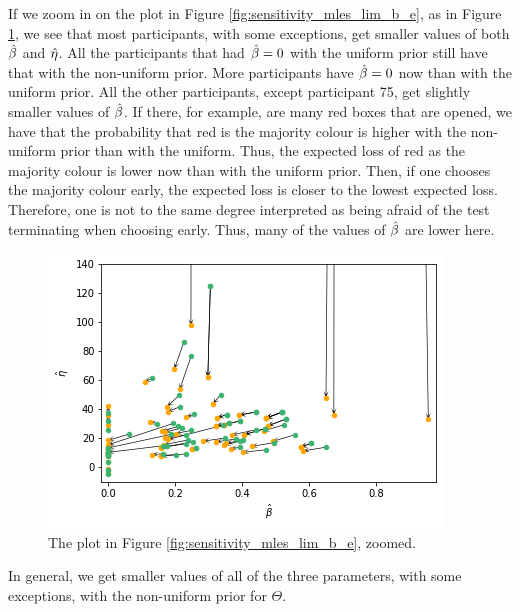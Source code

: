 If we zoom in on the plot in Figure \ref{fig:sensitivity_mles_lim_b_e}, as in Figure \ref{fig:sensitivity_mles_lim_b_e_zoomed}, we see that most participants, with some exceptions, get smaller values of both $\hat{\beta}$ and $\hat{\eta}$. All the participants that had $\hat{\beta}=0$ with the uniform prior still have that with the non-uniform prior. More participants have $\hat{\beta}=0$ now than with the uniform prior. All the other participants, except participant 75, get slightly smaller values of $\hat{\beta}$.
If there, for example, are many red boxes that are opened, we have that the probability that red is the majority colour is higher with the non-uniform prior than with the uniform. Thus, the expected loss of red as the majority colour is lower now than with the uniform prior. Then, if one chooses the majority colour early, the expected loss is closer to the lowest expected loss. Therefore, one is not to the same degree interpreted as being afraid of the test terminating when choosing early. Thus, many of the values of $\hat{\beta}$ are lower here. 
\begin{figure}
    \centering
    \includegraphics[scale=0.8]{pictures/Sensitivity/mles_lim_b_e_zoomed.png}
    \caption[MLEs of $\beta$ and $\eta$, zoomed]{The plot in Figure \ref{fig:sensitivity_mles_lim_b_e}, zoomed.}
    \label{fig:sensitivity_mles_lim_b_e_zoomed}
\end{figure}

In general, we get smaller values of all of the three parameters, with some exceptions, with the non-uniform prior for $\Theta$.

